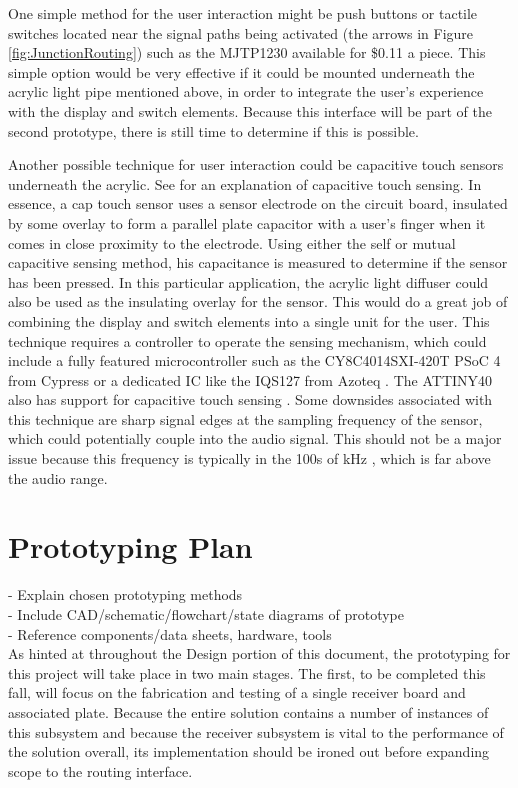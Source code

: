 \documentclass{article}
\begin{document}
		One simple method for the user interaction might be push buttons or tactile switches located near the signal paths being activated (the arrows in Figure \ref{fig:JunctionRouting}) such as the MJTP1230 \cite{MJTP1230datasheet} available for \$0.11 a piece.  This simple option would be very effective if it could be mounted underneath the acrylic light pipe mentioned above, in order to integrate the user's experience with the display and switch elements.  Because this interface will be part of the second prototype, there is still time to determine if this is possible.

		Another possible technique for user interaction could be capacitive touch sensors underneath the acrylic.  See \cite{CypressCapSense} for an explanation of capacitive touch sensing.  In essence, a cap touch sensor uses a sensor electrode on the circuit board, insulated by some overlay to form a parallel plate capacitor with a user's finger when it comes in close proximity to the electrode.  Using either the self or mutual capacitive sensing method, his capacitance is measured to determine if the sensor has been pressed.  In this particular application, the acrylic light diffuser could also be used as the insulating overlay for the sensor.  This would do a great job of combining the display and switch elements into a single unit for the user.  This technique requires a controller to operate the sensing mechanism, which could include a fully featured microcontroller such as the CY8C4014SXI-420T PSoC 4 from Cypress \cite{PSoC4datasheet} or a dedicated IC like the IQS127 from Azoteq \cite{IQS127datasheet}.  The ATTINY40 also has support for capacitive touch sensing \cite{ATTINY40datasheet}.  Some downsides associated with this technique are sharp signal edges at the sampling frequency of the sensor, which could potentially couple into the audio signal.  This should not be a major issue because this frequency is typically in the 100s of kHz \cite{IQS127datasheet}, which is far above the audio range.


\section{Prototyping Plan}
	- Explain chosen prototyping methods \\
	- Include CAD/schematic/flowchart/state diagrams of prototype \\
	- Reference components/data sheets, hardware, tools \\

	As hinted at throughout the Design portion of this document, the prototyping for this project will take place in two main stages.  The first, to be completed this fall, will focus on the fabrication and testing of a single receiver board and associated plate.  Because the entire solution contains a number of instances of this subsystem and because the receiver subsystem is vital to the performance of the solution overall, its implementation should be ironed out before expanding scope to the routing interface.
\end{document}
